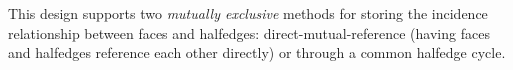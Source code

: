 This design supports two {\em mutually exclusive} methods for 
storing the incidence relationship between faces and halfedges:
direct-mutual-reference (having faces and halfedges reference 
each other directly) or through a common halfedge cycle.

